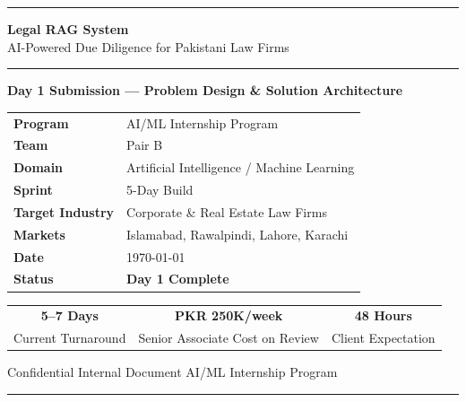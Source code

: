 \documentclass[12pt, a4paper]{article}
\begin{document}
\begin{titlepage}
\centering
\vspace*{1.8cm}

{\color{primary}\rule{\textwidth}{2.5pt}}
\vspace{0.6cm}

{\Huge\bfseries\color{primary} Legal RAG System}\\[0.45cm]
{\LARGE\color{accent} AI-Powered Due Diligence for Pakistani Law Firms}\\[0.35cm]

{\color{primary}\rule{\textwidth}{0.5pt}}
\vspace{1.6cm}

{\large\bfseries Day 1 Submission --- Problem Design \& Solution Architecture}

\vspace{2cm}

\begin{tabular}{@{}ll@{}}
    \textbf{Program}        & AI/ML Internship Program \\[0.25cm]
    \textbf{Team}           & Pair B \\[0.25cm]
    \textbf{Domain}         & Artificial Intelligence / Machine Learning \\[0.25cm]
    \textbf{Sprint}         & 5-Day Build \\[0.25cm]
    \textbf{Target Industry}& Corporate \& Real Estate Law Firms \\[0.25cm]
    \textbf{Markets}        & Islamabad, Rawalpindi, Lahore, Karachi \\[0.25cm]
    \textbf{Date}           & \today \\[0.25cm]
    \textbf{Status}         & \textcolor{successgreen}{\textbf{Day 1 Complete}} \\
\end{tabular}

\vspace{2.2cm}

\begin{metricbox}
\centering
\vspace{0.2cm}
\begin{tabular}{@{}ccc@{}}
    {\large\bfseries 5--7 Days}         &
    {\large\bfseries PKR 250K/week}      &
    {\large\bfseries 48 Hours}           \\[0.15cm]
    Current Turnaround                   &
    Senior Associate Cost on Review      &
    Client Expectation                   \\
\end{tabular}
\vspace{0.1cm}
\end{metricbox}

\vfill
{\small\color{darkgray} Confidential \textperiodcentered{}
Internal Document \textperiodcentered{} AI/ML Internship Program}\\[0.3cm]
{\color{primary}\rule{\textwidth}{2.5pt}}
\end{titlepage}
\end{document}
